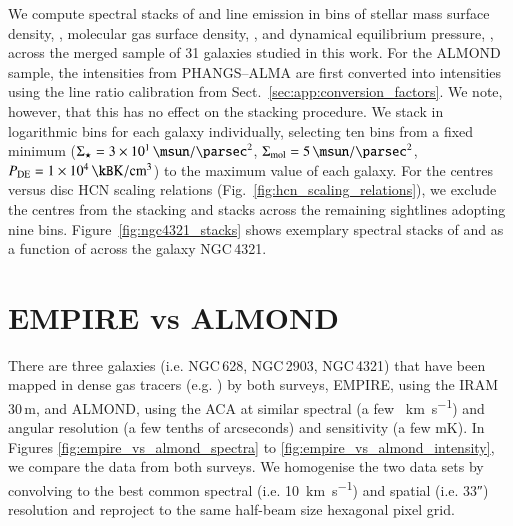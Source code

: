 \documentclass[letter, longauth]{aa} %
\begin{document}
\begin{appendix}
We compute spectral stacks of \hcnone and \coone line emission in bins of stellar mass surface density, \sigstar, molecular gas surface density, \sigmol, and dynamical equilibrium pressure, \pde, across the merged sample of 31 galaxies studied in this work.
For the ALMOND sample, the \cotwo intensities from PHANGS--ALMA are first converted into \coone intensities using the line ratio calibration from Sect.~\ref{sec:app:conversion_factors}. 
We note, however, that this has no effect on the stacking procedure. 
We stack in logarithmic bins for each galaxy individually, selecting ten bins from a fixed minimum ($\sigstar=\SI{3e1}{\msun\per\square\parsec}$, $\sigmol=\SI{5e0}{\msun\per\square\parsec}$, $\pde=\SI{1e4}{\kB\kelvin\per\cubic\cm}$) to the maximum value of each galaxy.
For the centres versus disc HCN scaling relations (Fig.~\ref{fig:hcn_scaling_relations}), we exclude the centres from the stacking and stacks across the remaining sightlines adopting nine bins.
Figure~\ref{fig:ngc4321_stacks} shows exemplary spectral stacks of \hcnone and \coone as a function of \sigstar across the galaxy NGC\,4321.




\section{EMPIRE vs ALMOND}
\label{sec:app:empire_vs_almond}

There are three galaxies (i.e. NGC\,628, NGC\,2903, NGC\,4321) that have been mapped in dense gas tracers (e.g. \hcnone) by both surveys, EMPIRE, using the IRAM 30\,m, and ALMOND, using the ACA at similar spectral (a few \SI{}{\km\per\second}) and angular resolution (a few tenths of arcseconds) and sensitivity (a few mK).
In Figures \ref{fig:empire_vs_almond_spectra} to \ref{fig:empire_vs_almond_intensity}, we compare 
the \hcnone data from both surveys.
We homogenise the two data sets by convolving to the best common spectral (i.e. \SI{10}{\km\per\s}) and spatial (i.e. \ang{;;33}) resolution and reproject to the same half-beam size hexagonal pixel grid.


\end{appendix}
\end{document}
